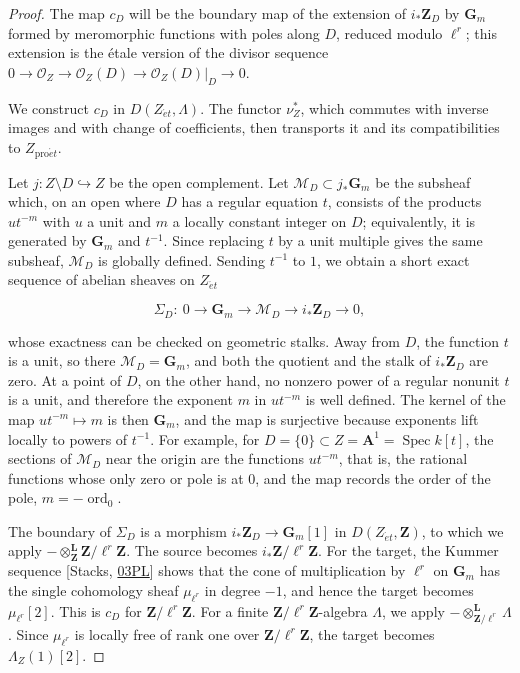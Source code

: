 \documentclass[11pt]{article}
\begin{document}
\begin{proof}[{Proof}]\label{bp524}%
The map \(c_D\) will be the boundary map of the extension of \(i_*\mathbf Z_D\) by \(\mathbf G_m\) formed by meromorphic functions with poles along \(D\), reduced modulo \(\ell^r\); this extension is the étale version of the divisor sequence \(0\to\mathcal O_Z\to\mathcal O_Z(D)\to
\mathcal O_Z(D)|_D\to0\).

We construct \(c_D\) in \(D(Z_{\acute{e}t},\Lambda)\). The functor \(\nu_Z^*\), which commutes with inverse images and with change of coefficients, then transports it and its compatibilities to \(Z_{\mathrm{pro}\acute{e}t}\).

Let \(j:Z\setminus D\hookrightarrow Z\) be the open complement. Let \(\mathcal M_D\subset j_*\mathbf G_m\) be the subsheaf which, on an open where \(D\) has a regular equation \(t\), consists of the products \(ut^{-m}\) with \(u\) a unit and \(m\) a locally constant integer on \(D\); equivalently, it is generated by \(\mathbf G_m\) and \(t^{-1}\). Since replacing \(t\) by a unit multiple gives the same subsheaf, \(\mathcal M_D\) is globally defined. Sending \(t^{-1}\) to \(1\), we obtain a short exact sequence of abelian sheaves on \(Z_{\acute{e}t}\)

\[
\Sigma_D:\ 0\longrightarrow\mathbf G_m\longrightarrow \mathcal M_D
\longrightarrow i_*\mathbf Z_D\longrightarrow0,
\tag{6.3}
\]

whose exactness can be checked on geometric stalks. Away from \(D\), the function \(t\) is a unit, so there \(\mathcal M_D=\mathbf G_m\), and both the quotient and the stalk of \(i_*\mathbf Z_D\) are zero. At a point of \(D\), on the other hand, no nonzero power of a regular nonunit \(t\) is a unit, and therefore the exponent \(m\) in \(ut^{-m}\) is well defined. The kernel of the map \(ut^{-m}\mapsto m\) is then \(\mathbf G_m\), and the map is surjective because exponents lift locally to powers of \(t^{-1}\). For example, for \(D=\{0\}\subset Z=\mathbf A^1=\operatorname{Spec}k[t]\), the sections of \(\mathcal M_D\) near the origin are the functions \(ut^{-m}\), that is, the rational functions whose only zero or pole is at \(0\), and the map records the order of the pole, \(m=-\operatorname{ord}_0\).

The boundary of \(\Sigma_D\) is a morphism \(i_*\mathbf Z_D\to\mathbf G_m[1]\) in \(D(Z_{\acute{e}t},\mathbf Z)\), to which we apply \(-\otimes^{\mathbf L}_{\mathbf Z}\mathbf Z/\ell^r\mathbf Z\). The source becomes \(i_*\mathbf Z/\ell^r\mathbf Z\). For the target, the Kummer sequence [Stacks, \href{https://stacks.math.columbia.edu/tag/03PL}{03PL}] shows that the cone of multiplication by \(\ell^r\) on \(\mathbf G_m\) has the single cohomology sheaf \(\mu_{\ell^r}\) in degree \(-1\), and hence the target becomes \(\mu_{\ell^r}[2]\). This is \(c_D\) for \(\mathbf Z/\ell^r\mathbf Z\). For a finite \(\mathbf Z/\ell^r\mathbf Z\)-algebra \(\Lambda\), we apply \(-\otimes^{\mathbf L}_{\mathbf Z/\ell^r}\Lambda\). Since \(\mu_{\ell^r}\) is locally free of rank one over \(\mathbf Z/\ell^r\mathbf Z\), the target becomes \(\Lambda_Z(1)[2]\).


\end{proof}
\end{document}
